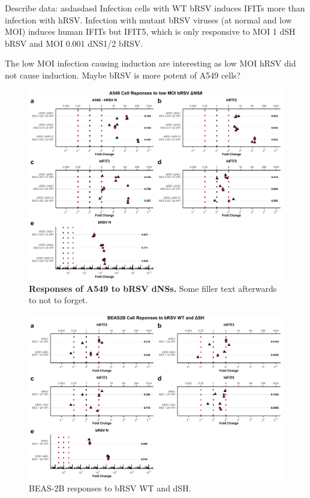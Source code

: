 Describe data: \newline
asdasdasd \newline
Infection cells with WT bRSV induces IFITs more than infection with hRSV.  Infection with mutant bRSV viruses (at normal and low MOI) induces human IFITs but IFIT5, which is only responsive to MOI 1 dSH bRSV and MOI 0.001 dNS1/2 bRSV.

The low MOI infection causing induction are interesting as low MOI hRSV did not cause induction. Maybe bRSV is more potent of A549 cells?

\begin{figure}
    \centering
    \includegraphics[width=1\linewidth]{06. Chapter 1/Figs/01. Induction/08. a549_brsv_dns.pdf}
    \caption[Responses of A549 to bRSV dNSs.]{\textbf{Responses of A549 to bRSV dNSs.} Some filler text afterwards to not to forget.}
    \label{Responses of A549 to bRSV dNSs.}
\end{figure}

\begin{figure}
    \centering
    \includegraphics[width=1\linewidth]{06. Chapter 1/Figs/01. Induction/11. beas2b_brsv_moi1.pdf}
    \caption[BEAS-2B responses to bRSV WT and dSH.]{BEAS-2B responses to bRSV WT and dSH.}
    \label{BEAS-2B responses to bRSV WT and dSH.}
\end{figure}

